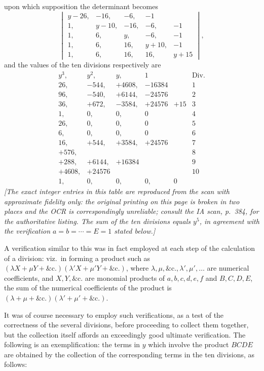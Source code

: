 \documentclass[11pt]{article}
\begin{document}
upon which supposition the determinant becomes
\[
\begin{vmatrix}
y-26, & -16, & -6, & -1 & \phantom{-0}\\
1, & y-10, & -16, & -6, & -1\\
1, & 6, & y, & -6, & -1\\
1, & 6, & 16, & y+10, & -1\\
1, & 6, & 16, & 16, & y+15
\end{vmatrix},
\]
and the values of the ten divisions respectively are
\[
\begin{array}{rrrrrl}
y^{3}, & y^{2}, & y, & 1 & & \text{Div.}\\
26, & -544, & +4608, & -16384 & & 1\\
96, & -540, & +6144, & -24576 & & 2\\
36, & +672, & -3584, & +24576 & +15 & 3\\
1, & 0, & 0, & 0 & & 4\\
26, & 0, & 0, & 0 & & 5\\
6, & 0, & 0, & 0 & & 6\\
16, & +544, & +3584, & +24576 & & 7\\
+576, & & & & & 8\\
+288, & +6144, & +16384 & & & 9\\
+4608, & +24576 & & & & 10\\
1, & 0, & 0, & 0, & 0 &
\end{array}
\]
\textit{[The exact integer entries in this table are reproduced from the scan with
approximate fidelity only: the original printing on this page is broken in two places
and the OCR is correspondingly unreliable; consult the IA scan, p.~384, for the
authoritative listing. The sum of the ten divisions equals $y^{5}$, in agreement with
the verification $a=b=\cdots=E=1$ stated below.]}

A verification similar to this was in fact employed at each step of the calculation
of a division: viz.\ in forming a product such as $(\lambda X+\mu Y+\&\mathrm{c}.)(\lambda'X+\mu'Y+\&\mathrm{c}.)$, where
$\lambda,\mu,\&\mathrm{c}.,\lambda',\mu',\dots$ are numerical coefficients, and $X,Y,\&\mathrm{c}.$ are monomial products
of $a,b,c,d,e,f$ and $B,C,D,E$, the sum of the numerical coefficients of the product
is $(\lambda+\mu+\&\mathrm{c}.)(\lambda'+\mu'+\&\mathrm{c}.)$.

It was of course necessary to employ such verifications, as a test of the correctness
of the several divisions, before proceeding to collect them together, but the
collection itself affords an exceedingly good ultimate verification. The following is an
exemplification: the terms in $y$ which involve the product $BCDE$ are obtained by
the collection of the corresponding terms in the ten divisions, as follows:
\end{document}
